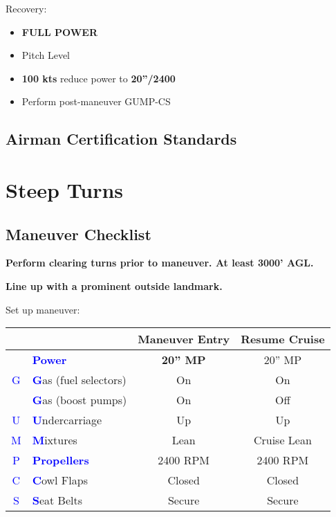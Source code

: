{Recovery:
\begin{itemize}[label={}]
\item \textbf{FULL POWER}
\item Pitch Level
\item \textbf{100 kts} reduce power to \textbf{20''/2400}
\item Perform post-maneuver GUMP-CS
\end{itemize}

\subsection{Airman Certification Standards}
\newpage

\section{Steep Turns}
\subsection{Maneuver Checklist}

\textbf{Perform clearing turns prior to maneuver. At least 3000' AGL.}

\textbf{Line up with a prominent outside landmark.}

Set up maneuver:

\begin{table}[H]
\centering
\begin{tabular}{|c|l|c|c|}
\hline
                    &                                                 & \textbf{Maneuver Entry} & \textbf{Resume Cruise} \\ \hline
                    & \textcolor{blue}{\textbf{Power}}                & \textbf{20'' MP}        & 20'' MP                \\ \hline
\textcolor{blue}{G} & \textcolor{blue}{\textbf{G}}as (fuel selectors) & On                      & On                     \\
                    & \textcolor{blue}{\textbf{G}}as (boost pumps)    & On                      & Off                    \\ \hline
\textcolor{blue}{U} & \textcolor{blue}{\textbf{U}}ndercarriage        & Up                      & Up                     \\ \hline
\textcolor{blue}{M} & \textcolor{blue}{\textbf{M}}ixtures             & Lean                    & Cruise Lean            \\ \hline
\textcolor{blue}{P} & \textcolor{blue}{\textbf{Propellers}}           & 2400 RPM                & 2400 RPM               \\ \hline
\textcolor{blue}{C} & \textcolor{blue}{\textbf{C}}owl Flaps           & Closed                  & Closed                 \\ \hline
\textcolor{blue}{S} & \textcolor{blue}{\textbf{S}}eat Belts           & Secure                  & Secure                 \\ \hline
\end{tabular}
\end{table}

}
